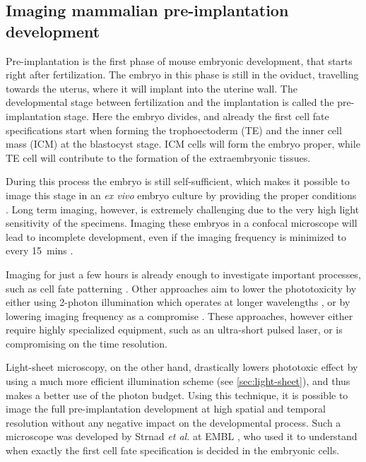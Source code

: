   \subsection{Imaging mammalian pre-implantation development}

    Pre-implantation is the first phase of mouse embryonic development, that starts right after fertilization. The embryo in this phase is still in the oviduct, travelling towards the uterus, where it will implant into the uterine wall. The developmental stage between fertilization and the implantation is called the pre-implantation stage. Here the embryo divides, and already the first cell fate specifications start when forming the trophoectoderm (TE) and the inner cell mass (ICM) at the blastocyst stage. ICM cells will form the embryo proper, while TE cell will contribute to the formation of the extraembryonic tissues.
    
    During this process the embryo is still self-sufficient, which makes it possible to image this stage in an \textit{ex vivo} embryo culture by providing the proper conditions \cite{doherty_culture_2000}. Long term imaging, however, is extremely challenging due to the very high light sensitivity of the specimens. Imaging these embryos in a confocal microscope will lead to incomplete development, even if the imaging frequency is minimized to every \SI{15}{mins} \cite{strnad_inverted_2016}.

    Imaging for just a few hours is already enough to investigate important processes, such as cell fate patterning \cite{dietrich_stochastic_2007}. Other approaches aim to lower the phototoxicity by either using 2-photon illumination which operates at longer wavelengths \cite{denk_two-photon_1990,squirrell_long-term_1999,mcdole_lineage_2011}, or by lowering imaging frequency as a compromise \cite{yamagata_long-term_2009}. These approaches, however either require highly specialized equipment, such as an ultra-short pulsed laser, or is compromising on the time resolution.

    Light-sheet microscopy, on the other hand, drastically lowers phototoxic effect by using a much more efficient illumination scheme (see \autoref{sec:light-sheet}), and thus makes a better use of the photon budget. Using this technique, it is possible to image the full pre-implantation development at high spatial and temporal resolution without any negative impact on the developmental process. Such a microscope was developed by Strnad \textit{et al.} at EMBL \cite{strnad_inverted_2016}, who used it to understand when exactly the first cell fate specification is decided in the embryonic cells.

